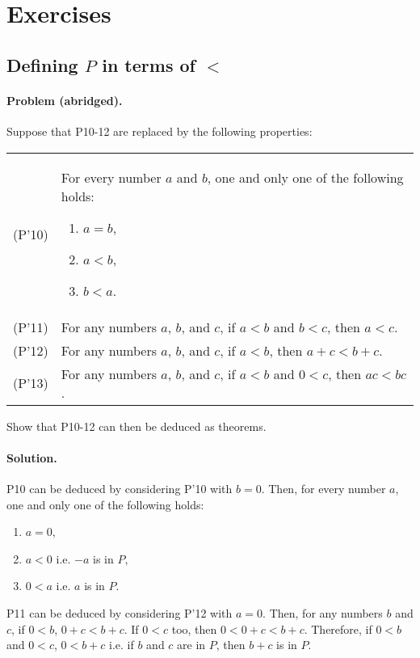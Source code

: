 \documentclass{article}
\begin{document}
\section{Exercises}

\setcounter{subsection}{7}
\subsection{Defining $P$ in terms of $<$}

\paragraph{Problem (abridged).} Suppose that P10-12 are replaced by the
following properties:

\begin{tabular}{l p{4in}}
  (P'10) & For every number $a$ and $b$, one and only one of the following
  holds: \begin{enumerate}
    \itemsep0em
    \item $a = b$,
    \item $a < b$,
    \item $b < a$.
  \end{enumerate} \\
  (P'11) & For any numbers $a$, $b$, and $c$, if $a < b$ and $b < c$, then $a <
  c$. \\
  (P'12) & For any numbers $a$, $b$, and $c$, if $a < b$, then $a + c < b + c$.
  \\
  (P'13) & For any numbers $a$, $b$, and $c$, if $a < b$ and $0 < c$, then $ac
  < bc$. \\
\end{tabular}

Show that P10-12 can then be deduced as theorems.

\paragraph{Solution.} P10 can be deduced by considering P'10 with $b = 0$.
Then, for every number $a$, one and only one of the following holds:
\begin{enumerate}
  \itemsep0em
  \item $a = 0$,
  \item $a < 0$ i.e. $-a$ is in $P$,
  \item $0 < a$ i.e. $a$ is in $P$.
\end{enumerate}

P11 can be deduced by considering P'12 with $a = 0$. Then, for any numbers $b$
and $c$, if $0 < b$, $0 + c < b + c$. If $0 < c$ too, then $0 < 0 + c < b + c$.
Therefore, if $0 < b$ and $0 < c$, $0 < b + c$ i.e. if $b$ and $c$ are in $P$,
then $b + c$ is in $P$.
\end{document}
